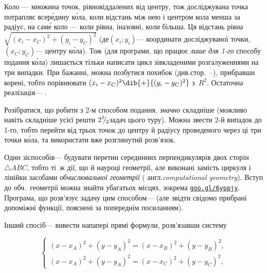 \Tutorial	Коло --- множина точок, рівновіддалених від центру, тож досліджувана точка потрапляє всер\'{е}дину к\'{о}ла, коли відстань між нею і центром кола менша за радіус, на сам\'{е} коло --- коли рівна, і\nolinebreak[3] назовні, коли більша. Ця відстань рівна $\sqrt{(x_i-x_C)^2+(y_i-y_C)^2}$ (де\nolinebreak[3] $(x_i; y_i)$\nolinebreak[3] --- координати досліджуваної точки, $(x_C; y_C)$\nolinebreak[3] --- центру к\'{о}ла). Тож (для програми, що працює \emph{лише для \mbox{1-го}} способу подання к\'{о}ла) лишається тільки написати цикл зі\nolinebreak[3] вкладеними розгалуженнями на три випадки. При бажанні, можна позбутися похибок (див.\nolinebreak[3] стор.~\pageref{sec:floating-point}--\nolinebreak[3]\pageref{text:floating-point-end}), прибравши корені, тобто порівнювати ${(x_i-x_C)^2}\dib{{+}}{(y_i-y_C)^2}$ з~$R^2$. Остаточна реалізація\nolinebreak[3] --- .

Розібратися, що робити з \mbox{2-м} способом подання, \emph{значно} складніше (можливо навіть складніше усієї решти 
${2\lefteqn{{}^{1}}{}^{\,}\lefteqn{/}{}_{\,\,\,2}}$\nolinebreak[3] задач цього туру). Можна звести \mbox{2-й} випадок до \mbox{1-го}, тобто перейти від трьох точок до центру й радіусу проведеного через ці три точки к\'{о}ла, та використати вже розглянутий розв'язок.

Один зі\nolinebreak[3] способів\nolinebreak[3] --- будувати перетин серединних перпендикулярів двох сторін $\triangle{}ABC$, тобто ті~ж дії, що й на\nolinebreak[3] уроці геометрії, але виконані замість циркуля і лінійки засобами \emph{обчислювальної геометрії} (%
англ.\nolinebreak[3] \emph{computational geometry}). Вступ до обч.~геометрії можна знайти у\nolinebreak[3] багатьох місцях, зокрема \href{https://goo.gl/6yppjy}{\texttt{\mbox{goo.gl/}\nolinebreak[2]\mbox{6yppjy}}}. Програма, що розв'язує задачу цим способом\nolinebreak[3] ---  (але звідти свідомо прибрані допоміжні функції, пояснені за попереднім посиланням).

Інший спосіб\nolinebreak[3] --- вивести на\nolinebreak[3] папері прямі формули, розв'язавши систему

\vspace{-0.5\baselineskip}

$$\left\{
\begin{array}{c}
(x{-}x_A)^2+(y{-}y_A)^2 = (x{-}x_B)^2+(y{-}y_B)^2,\\
(x{-}x_A)^2+(y{-}y_A)^2 = (x{-}x_C)^2+(y{-}y_C)^2,
\end{array}
\right.$$

